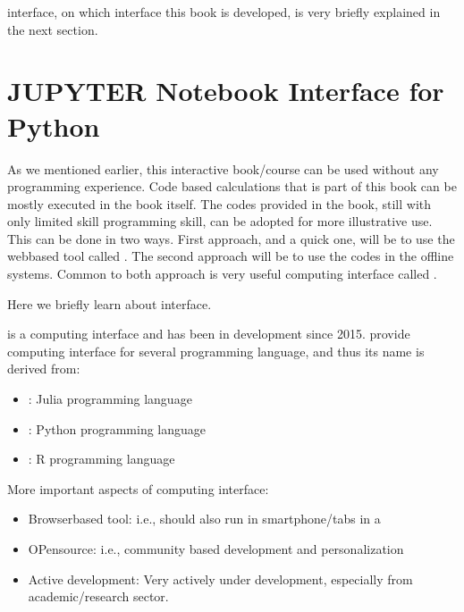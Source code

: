 \documentclass[letterpaper,10pt,english]{sphinxmanual}
\begin{document}
 interface, on which interface this book is developed, is very briefly explained in the next section.


\section{JUPYTER Notebook Interface for Python}
\label{\detokenize{contents/background/02_jupyter:jupyter-notebook-interface-for-python}}\label{\detokenize{contents/background/02_jupyter::doc}}
As we mentioned earlier, this interactive book/course can be used without any programming experience. Code based calculations that is part of this book can be mostly executed in the book itself. The codes provided in the book, still with only limited skill programming skill, can be adopted for more illustrative use. This can be done in two ways. First approach, and a quick one, will be to use the web\sphinxhyphen{}based tool called . The second approach will be to use the codes in the off\sphinxhyphen{}line systems. Common to both approach is very useful computing interface called .

Here we briefly learn about  interface.

 is a computing interface and has been in development since 2015.  provide computing interface for several programming language, and thus its name is derived from:
\begin{itemize}
\item {} 
 : Julia programming language

\item {} 
 : Python programming language

\item {} 
  : R programming language

\end{itemize}

More important aspects of  computing interface:
\begin{itemize}
\item {} 
Browser\sphinxhyphen{}based tool: \sphinxhyphen{} i.e., should also run in smartphone/tabs in a

\item {} 
OPen\sphinxhyphen{}source: i.e., community based development and personalization

\item {} 
Active development: Very actively under development, especially from academic/research sector.

\end{itemize}
\end{document}
